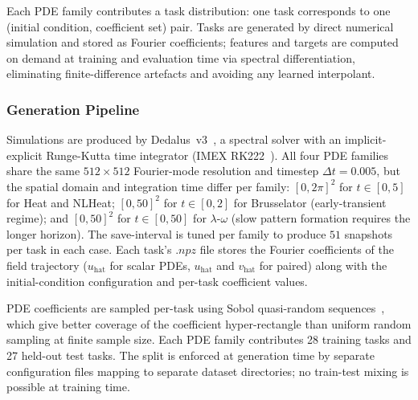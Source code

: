 \documentclass[10pt,journal,compsoc]{IEEEtran}
\begin{document}
Each PDE family contributes a task distribution: one task corresponds to one
(initial condition, coefficient set) pair. Tasks are generated by direct
numerical simulation and stored as Fourier coefficients; features and targets
are computed on demand at training and evaluation time via spectral
differentiation, eliminating finite-difference artefacts and avoiding any
learned interpolant.

\subsubsection{Generation Pipeline}\label{subsubsec:data_generation}

Simulations are produced by Dedalus~v3~\cite{dedalus2020}, a spectral
solver with an implicit-explicit Runge-Kutta time integrator (IMEX
RK222~\cite{ascher1997}). All four PDE families share the same
$512 \times 512$ Fourier-mode resolution and timestep $\Delta t = 0.005$,
but the spatial domain and integration time differ per family:
$[0, 2\pi]^2$ for $t \in [0, 5]$ for Heat and NLHeat;
$[0, 50]^2$ for $t \in [0, 2]$ for Brusselator
(early-transient regime); and
$[0, 50]^2$ for $t \in [0, 50]$ for $\lambda$-$\omega$
(slow pattern formation requires the longer horizon). The
save-interval is tuned per family to produce $51$ snapshots per task in
each case. Each task's $.npz$ file stores the Fourier coefficients of the
field trajectory ($u_{\text{hat}}$ for scalar PDEs, $u_{\text{hat}}$ and
$v_{\text{hat}}$ for paired) along with the initial-condition
configuration and per-task coefficient values.

PDE coefficients are sampled per-task using Sobol quasi-random
sequences~\cite{sobol1967}, which give better coverage of the
coefficient hyper-rectangle than uniform random sampling at finite sample
size. Each PDE family contributes 28 training tasks and 27 held-out test
tasks. The split is enforced at generation time by separate configuration
files mapping to separate dataset directories; no train-test mixing is
possible at training time.
\end{document}
